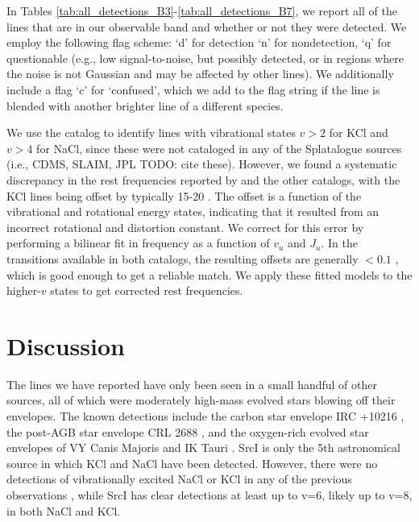 \documentclass[twocolumn]{aastex62}
\newcommand{\sourcei}{SrcI\xspace}
\begin{document}
In Tables \ref{tab:all_detections_B3}-\ref{tab:all_detections_B7}, we report
all of the lines that are in our observable band and whether or not they were
detected.  We employ the following
flag scheme:
`d' for detection `n' for nondetection, `q' for questionable (e.g., low
signal-to-noise, but possibly detected, or in regions where the noise is
not Gaussian and may be affected by other lines).
We additionally include a flag `c' for `confused', which we add to the flag
string if the line is blended with another brighter line of a different species.

We use the \citet{Barton2014a} catalog to identify lines with vibrational
states $v>2$ for KCl and $v>4$ for NaCl, since these were not cataloged in any
of the Splatalogue sources (i.e., CDMS, SLAIM, JPL {\color{red}TODO: cite
these}).   However, we found a systematic discrepancy in the rest frequencies
reported by \citet{Barton2014a} and the other catalogs, with the KCl lines
being offset by typically 15-20 \kms.  The offset is a function of the vibrational
and rotational energy states, indicating that it resulted from an incorrect rotational
and distortion constant.  We correct for this error by performing a bilinear fit
in frequency as a function of $v_u$ and $J_u$.  In the transitions available
in both catalogs, the resulting offsets are generally $<0.1$ \kms, which is
good enough to get a reliable match.  We apply these fitted models to the
higher-$v$ states to get corrected rest frequencies.










\section{Discussion}
The lines we have reported have only been seen in a small handful of other sources,
all of which were moderately high-mass evolved stars blowing off their envelopes.
The known detections include the carbon star envelope IRC +10216 \citep{Cernicharo1987a},
the post-AGB star envelope CRL 2688 \citep{Highberger2003a}, and the oxygen-rich
evolved star envelopes of VY Canis Majoris and IK Tauri \citep{Milam2007a}.
\sourcei is only the 5th astronomical source in which KCl and NaCl have been
detected.
However, there were no detections of vibrationally excited NaCl or KCl in any
of the previous observations \citep[][presented the most systematic study of salt
lines, which only included detections of v=0 rotational transitions]{Agundez2012a},
while \sourcei has clear detections at least up to v=6, likely up to v=8, in both
NaCl and KCl.
\end{document}
